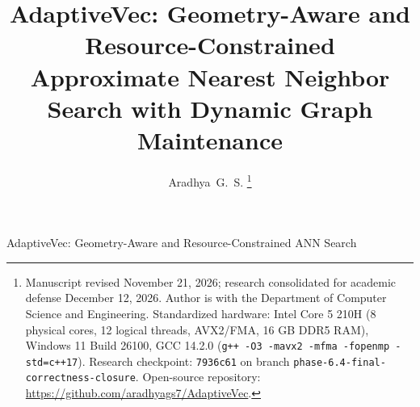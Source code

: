\documentclass[10pt,journal,compsoc]{IEEEtran}
\begin{document}
\title{AdaptiveVec: Geometry-Aware and Resource-Constrained Approximate Nearest Neighbor Search with Dynamic Graph Maintenance}

\author{Aradhya~G.~S.%
\thanks{Manuscript revised November 21, 2026; research consolidated for academic defense December 12, 2026. Author is with the Department of Computer Science and Engineering. Standardized hardware: Intel Core 5 210H (8 physical cores, 12 logical threads, AVX2/FMA, 16 GB DDR5 RAM), Windows 11 Build 26100, GCC 14.2.0 (\texttt{g++ -O3 -mavx2 -mfma -fopenmp -std=c++17}). Research checkpoint: \texttt{7936c61} on branch \texttt{phase-6.4-final-correctness-closure}. Open-source repository: \url{https://github.com/aradhyags7/AdaptiveVec}.}%
}

%
{AdaptiveVec: Geometry-Aware and Resource-Constrained ANN Search}
\end{document}
